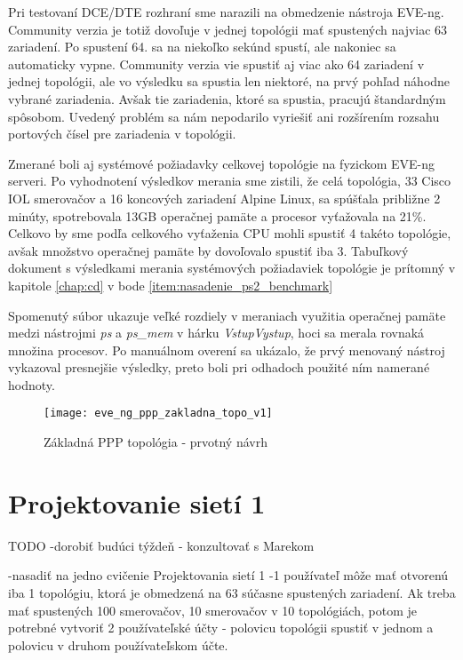 Pri testovaní DCE/DTE rozhraní sme narazili na obmedzenie nástroja EVE-ng. Community verzia je totiž dovoľuje v jednej topológii mať spustených najviac 63 zariadení. Po spustení 64. sa na niekoľko sekúnd spustí, ale nakoniec sa automaticky vypne. Community verzia vie spustiť aj viac ako 64 zariadení v jednej topológii, ale vo výsledku sa spustia len niektoré, na prvý pohľad náhodne vybrané zariadenia. Avšak tie zariadenia, ktoré sa spustia, pracujú štandardným spôsobom. Uvedený problém sa nám nepodarilo vyriešiť ani rozšírením rozsahu portových čísel pre zariadenia v topológii.
  
Zmerané boli aj systémové požiadavky celkovej topológie na fyzickom EVE-ng serveri. Po vyhodnotení výsledkov merania sme zistili, že celá topológia, 33 Cisco IOL smerovačov a 16 koncových zariadení Alpine Linux, sa spúšťala približne 2 minúty, spotrebovala 13GB operačnej pamäte a procesor vyťažovala na 21\%. Celkovo by sme podľa celkového vyťaženia CPU mohli spustiť 4 takéto topológie, avšak množstvo operačnej pamäte by dovoľovalo spustiť iba 3. Tabuľkový dokument s výsledkami merania systémových požiadaviek topológie je prítomný v kapitole \ref{chap:cd} v bode \ref{item:nasadenie_ps2_benchmark}

Spomenutý súbor ukazuje veľké rozdiely v meraniach využitia operačnej pamäte medzi nástrojmi \emph{ps} a \emph{ps\_mem} v hárku \emph{VstupVystup}, hoci sa merala rovnaká množina procesov. Po manuálnom overení sa ukázalo, že prvý menovaný nástroj vykazoval presnejšie výsledky, preto boli pri odhadoch použité ním namerané hodnoty.

\begin{figure}
    \centering
    \texttt{[image: eve\_ng\_ppp\_zakladna\_topo\_v1]}
    \caption{Základná PPP topológia - prvotný návrh}
    \label{obr:eve_ng_ppp_zakladna_topo_v1}
\end{figure}





\section{Projektovanie sietí 1}

{\huge TODO -dorobiť budúci týždeň - konzultovať s Marekom}

-nasadiť na jedno cvičenie Projektovania sietí 1
-1 používateľ môže mať otvorenú iba 1 topológiu, ktorá je obmedzená na 63 súčasne spustených zariadení. Ak treba mať spustených 100 smerovačov, 10 smerovačov v 10 topológiách, potom je potrebné vytvoriť 2 používateľské účty - polovicu topológii spustiť v jednom a polovicu v druhom používateľskom účte.


